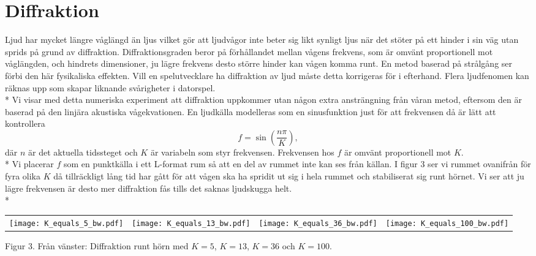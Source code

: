 \section*{Diffraktion}

Ljud har mycket längre våglängd än ljus vilket gör att ljudvågor inte beter sig likt synligt ljus när det stöter på ett hinder i sin väg utan sprids på grund av diffraktion. Diffraktionsgraden beror på förhållandet mellan vågens frekvens, som är omvänt proportionell mot våglängden, och hindrets dimensioner, ju lägre frekvens desto större hinder kan vågen komma runt. En metod baserad på strålgång ser förbi den här fysikaliska effekten. Vill en spelutvecklare ha diffraktion av ljud måste detta korrigeras för i efterhand. Flera ljudfenomen kan räknas upp som skapar liknande svårigheter i datorspel.\\*
\newline
Vi visar med detta numeriska experiment att diffraktion uppkommer utan någon extra ansträngning från våran metod, eftersom den är baserad på den linjära akustiska vågekvationen. En ljudkälla modelleras som en sinusfunktion just för att frekvensen då är lätt att kontrollera
\begin{equation}
f = \sin\left(\frac{n\pi}{K}\right),
\end{equation}
där $n$ är det aktuella tidssteget och $K$ är variabeln som styr frekvensen. Frekvensen hos $f$ är omvänt proportionell mot $K$.\\*
Vi placerar $f$ som en punktkälla i ett L-format rum så att en del av rummet inte kan ses från källan. I figur 3 ser vi rummet ovanifrån för fyra olika $K$ då tillräckligt lång tid har gått för att vågen ska ha spridit ut sig i hela rummet och stabiliserat sig runt hörnet. Vi ser att ju lägre frekvensen är desto mer diffraktion fås tills det saknas ljudskugga helt.\\*

\begin{minipage}{\linewidth}
\centering
\begin{tabular}{llll}
\texttt{[image: K\_equals\_5\_bw.pdf]} &
\texttt{[image: K\_equals\_13\_bw.pdf]} &
\texttt{[image: K\_equals\_36\_bw.pdf]} &
\texttt{[image: K\_equals\_100\_bw.pdf]}
\end{tabular}
\begin{center}
\caption{Figur 3. Från vänster: Diffraktion runt hörn med $K = 5$, $K = 13$, $K = 36$ och $K = 100$.}
\end{center}
\end{minipage}